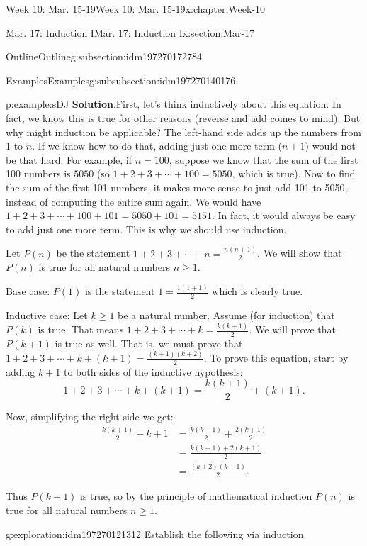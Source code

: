 \documentclass[oneside,10pt,]{book}
\newcommand{\blocktitlefont}{\relax}
\numberwithin{equation}{section}
\renewcommand{\ge}{\geqslant}
\newcommand{\amp}{&}
\begin{document}
\begin{chapterptx}{Week 10: Mar. 15-19}{}{Week 10: Mar. 15-19}{}{}{x:chapter:Week-10}
\begin{sectionptx}{Mar. 17: Induction I}{}{Mar. 17: Induction I}{}{}{x:section:Mar-17}
\begin{subsectionptx}{Outline}{}{Outline}{}{}{g:subsection:idm197270172784}
\begin{subsubsectionptx}{Examples}{}{Examples}{}{}{g:subsubsection:idm197270140176}
\begin{example}{}{p:example:sDJ}
\noindent\textbf{\blocktitlefont Solution}.\hypertarget{p:solution:JBU}{}\quad{}First, let's think inductively about this equation. In fact, we know this is true for other reasons (reverse and add comes to mind). But why might induction be applicable? The left-hand side adds up the numbers from 1 to \(n\). If we know how to do that, adding just one more term (\(n+1\)) would not be that hard. For example, if \(n = 100\), suppose we know that the sum of the first 100 numbers is \(5050\) (so \(1 + 2 + 3 + \cdots + 100 = 5050\), which is true). Now to find the sum of the first 101 numbers, it makes more sense to just add 101 to 5050, instead of computing the entire sum again. We would have \(1 + 2 + 3 + \cdots + 100 + 101 = 5050 + 101 = 5151\). In fact, it would always be easy to add just one more term. This is why we should use induction.%
\begin{solutionproof}
Let \(P(n)\) be the statement \(1 + 2 + 3 + \cdots + n = \frac{n(n+1)}{2}\). We will show that \(P(n)\) is true for all natural numbers \(n \ge 1\).%
\par
Base case: \(P(1)\) is the statement \(1 = \frac{1(1+1)}{2}\) which is clearly true.%
\par
Inductive case: Let \(k \ge 1\) be a natural number. Assume (for induction) that \(P(k)\) is true. That means \(1 + 2 + 3 + \cdots + k = \frac{k(k+1)}{2}\). We will prove that \(P(k+1)\) is true as well. That is, we must prove that \(1 + 2 + 3 + \cdots + k + (k+1) = \frac{(k+1)(k+2)}{2}\). To prove this equation, start by adding \(k+1\) to both sides of the inductive hypothesis:%
\begin{equation*}
1 + 2 + 3 + \cdots + k + (k+1) = \frac{k(k+1)}{2} + (k+1)\text{.}
\end{equation*}
%
\par
Now, simplifying the right side we get:%
\begin{align*}
\frac{k(k+1)}{2} + k+1 \amp = \frac{k(k+1)}{2} + \frac{2(k+1)}{2}\\
\amp = \frac{k(k+1) + 2(k+1)}{2}\\
\amp = \frac{(k+2)(k+1)}{2}\text{.}
\end{align*}
%
\par
Thus \(P(k+1)\) is true, so by the principle of mathematical induction \(P(n)\) is true for all natural numbers \(n \ge 1\).%
\end{solutionproof}
\end{example}
\begin{exploration}{}{g:exploration:idm197270121312}%
Establish the following via induction.%

\end{exploration}
\end{subsubsectionptx}
\end{subsectionptx}
\end{sectionptx}
\end{chapterptx}
\end{document}
